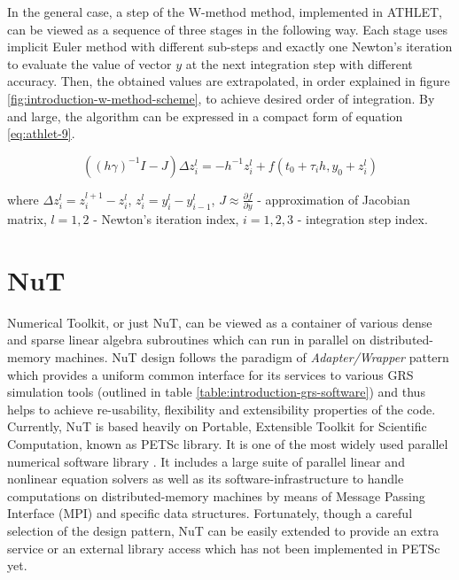 In the general case, a step of the W-method method, implemented in ATHLET, can be viewed as a sequence of three stages in the following way. Each stage uses implicit Euler method with different sub-steps  and exactly one Newton's iteration to evaluate the value of vector $y$ at the next integration step with different accuracy. Then, the obtained values are extrapolated, in order explained in figure \ref{fig:introduction-w-method-scheme}, to achieve desired order of integration. By and large, the algorithm can be expressed in a compact form of equation \ref{eq:athlet-9}.

\begin{equation} \label{eq:athlet-9}
	((h \gamma)^{-1}I - J) \Delta z^{l}_{i} = - h^{-1} z^{l}_{i} + f(t_0 + \tau_{i} h, y_{0} + z^{l}_{i})
\end{equation}

where $\Delta z^{l}_{i} = z^{l+1}_{i} - z^{l}_{i}$, $z^{l}_{i} = y^{l}_{i} - y^{l}_{i - 1}$, $J \approx \frac{\partial f}{\partial y}$ - approximation of Jacobian matrix, $l = 1,2$ - Newton's iteration index, $i = 1, 2, 3$ - integration step index.\\


\section{NuT}

Numerical Toolkit, or just NuT, can be viewed as a container of various dense and sparse linear algebra subroutines which can run in parallel on distributed-memory machines. NuT design follows the paradigm of \textit{Adapter/Wrapper} pattern which provides a uniform common interface for its services to various GRS simulation tools (outlined in table \ref{table:introduction-grs-software}) and thus helps to achieve re-usability, flexibility and extensibility properties of the code.\\


Currently, NuT is based heavily on Portable, Extensible Toolkit for Scientific Computation, known as PETSc library. It is one of the most widely used parallel numerical software  library \cite{wiki:petsc-general-info}. It includes a large suite of parallel linear and nonlinear equation solvers as well as its software-infrastructure to handle computations on distributed-memory machines by means of Message Passing Interface (MPI) and specific data structures. Fortunately, though a careful selection of the design pattern, NuT can be easily extended to provide an extra service or an external library access which has not been implemented in PETSc yet.\\ 


